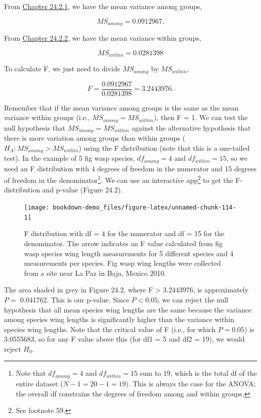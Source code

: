 \documentclass[
]{scrbook}
\begin{document}
From \protect\hyperlink{anova-mean-variance-among-groups}{Chapter 24.2.1}, we have the mean variance among groups,

\[MS_{among} = 0.0912967.\]

From \protect\hyperlink{anova-mean-variance-among-groups}{Chapter 24.2.2}, we have the mean variance within groups,

\[MS_{within} = 0.0281398\]

To calculate F, we just need to divide \(MS_{among}\) by \(MS_{within}\),

\[F = \frac{0.0912967}{0.0281398} = 3.2443976.\]

Remember that if the mean variance among groups is the same as the mean variance within groups (i.e., \(MS_{among} = MS_{within}\)), then F = 1.
We can test the null hypothesis that \(MS_{among} = MS_{within}\) against the alternative hypothesis that there is more variation among groups than within groups (\(H_{A}: MS_{among} > MS_{within}\)) using the F distribution (note that this is a one-tailed test).
In the example of 5 fig wasp species, \(df_{among} = 4\) and \(df_{within} = 15\),
so we need an F distribution with 4 degrees of freedom in the numerator and 15 degrees of freedom in the denominator\footnote{Note that \(df_{among} = 4\) and \(df_{within} = 15\) sum to 19, which is the total df of the entire dataset (\(N - 1 = 20 - 1 = 19\)). This is always the case for the ANOVA; the overall df constrains the degrees of freedom among and within groups.}.
We can use an interactive app\footnote{See footnote 59.} to get the F-distribution and p-value (Figure 24.2).

\begin{figure}
\texttt{[image: bookdown-demo\_files/figure-latex/unnamed-chunk-114-1]} \caption{F distribution with df = 4 for the numerator and df = 15 for the denominator. The arrow indicates an F value calculated from fig wasp species wing length measurements for 5 different species and 4 measurements per species. Fig wasp wing lengths were collected from a site near La Paz in Baja, Mexico 2010.}\label{fig:unnamed-chunk-114}
\end{figure}

The area shaded in grey in Figure 24.2, where F \textgreater{} 3.2443976, is approximately \(P =\) 0.041762.
This is our p-value.
Since \(P < 0.05\), we can reject the null hypothesis that all mean species wing lengths are the same because the variance among species wing lengths is significantly higher than the variance within species wing lengths.
Note that the critical value of F (i.e., for which \(P = 0.05\)) is 3.0555683, so for any F value above this (for df1 = 5 and df2 = 19), we would reject \(H_{0}\).
\end{document}
